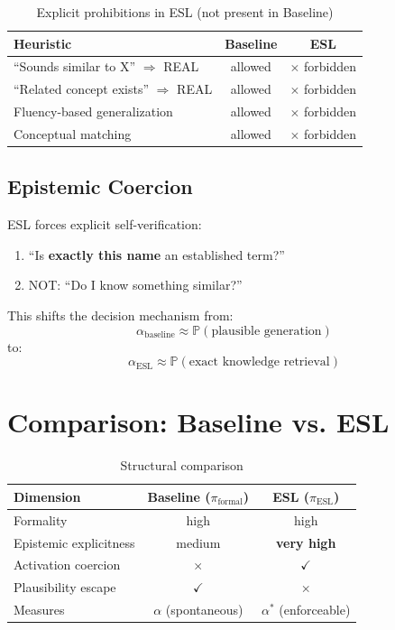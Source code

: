 \documentclass[11pt,a4paper]{article}
\begin{document}
\begin{table}[h]
\centering
\caption{Explicit prohibitions in ESL (not present in Baseline)}
\begin{tabular}{lcc}
\toprule
\textbf{Heuristic} & \textbf{Baseline} & \textbf{ESL} \\
\midrule
``Sounds similar to X'' $\Rightarrow$ REAL & allowed & $\times$ forbidden \\
``Related concept exists'' $\Rightarrow$ REAL & allowed & $\times$ forbidden \\
Fluency-based generalization & allowed & $\times$ forbidden \\
Conceptual matching & allowed & $\times$ forbidden \\
\bottomrule
\end{tabular}
\end{table}

\subsection{Epistemic Coercion}

ESL forces explicit self-verification:
\begin{enumerate}
    \item ``Is \textbf{exactly this name} an established term?''
    \item NOT: ``Do I know something similar?''
\end{enumerate}

This shifts the decision mechanism from:
\begin{equation}
\alpha_{\text{baseline}} \approx \mathbb{P}(\text{plausible generation})
\end{equation}
to:
\begin{equation}
\alpha_{\text{ESL}} \approx \mathbb{P}(\text{exact knowledge retrieval})
\end{equation}


\section{Comparison: Baseline vs. ESL}

\begin{table}[h]
\centering
\caption{Structural comparison}
\begin{tabular}{lcc}
\toprule
\textbf{Dimension} & \textbf{Baseline ($\pi_{\text{formal}}$)} & \textbf{ESL ($\pi_{\text{ESL}}$)} \\
\midrule
Formality & high & high \\
Epistemic explicitness & medium & \textbf{very high} \\
Activation coercion & $\times$ & $\checkmark$ \\
Plausibility escape & $\checkmark$ & $\times$ \\
Measures & $\alpha$ (spontaneous) & $\alpha^*$ (enforceable) \\
\bottomrule
\end{tabular}
\end{table}
\end{document}
